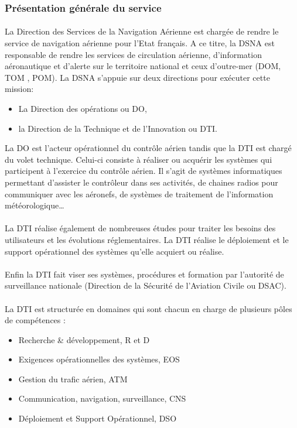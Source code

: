        \subsubsection{Présentation générale du service}
            \paragraph{}
La Direction des Services de la Navigation Aérienne est chargée de rendre le service de navigation aérienne pour l’Etat français. A ce titre, la DSNA est responsable de rendre les services de circulation aérienne, d’information aéronautique et d’alerte sur le territoire national et ceux d’outre-mer (DOM, TOM , POM). La DSNA s’appuie sur deux directions pour exécuter cette mission:
\begin{itemize}
\item La Direction des opérations ou DO,
\item la Direction de la Technique et de l’Innovation ou DTI.
\end{itemize}
La DO est l’acteur opérationnel du contrôle aérien tandis que la DTI est chargé du volet technique. Celui-ci consiste à réaliser ou acquérir les systèmes qui participent à l’exercice du contrôle aérien. Il s’agit de systèmes informatiques permettant d’assister le contrôleur dans ses activités, de chaines radios pour communiquer avec les aéronefs, de systèmes de traitement de l’information météorologique…
            \paragraph{}
La DTI réalise également de nombreuses études pour traiter les besoins des utilisateurs et les évolutions réglementaires. La DTI réalise le déploiement et le support opérationnel des systèmes qu’elle acquiert ou réalise. 
            \paragraph{}
Enfin la DTI fait viser ses systèmes, procédures et formation par l’autorité de surveillance nationale (Direction de la Sécurité de l'Aviation Civile ou DSAC).
            \paragraph{}
La DTI est structurée en domaines qui sont chacun en charge de plusieurs pôles de compétences :
\begin{itemize}
\item Recherche \& développement, R et D
\item Exigences opérationnelles des systèmes, EOS
\item Gestion du trafic aérien, ATM
\item Communication, navigation, surveillance, CNS
\item Déploiement et Support Opérationnel, DSO
\end{itemize}
